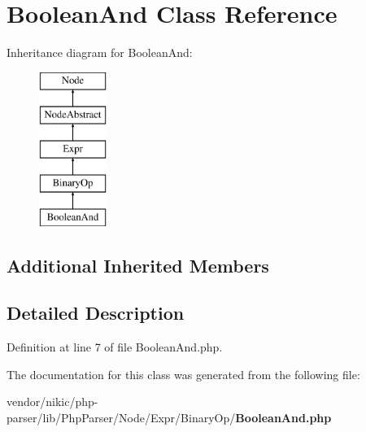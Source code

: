 \section{Boolean\+And Class Reference}
\label{class_php_parser_1_1_node_1_1_expr_1_1_binary_op_1_1_boolean_and}
Inheritance diagram for Boolean\+And\+:\begin{figure}[H]
\begin{center}
\leavevmode
\includegraphics[height=5.000000cm]{class_php_parser_1_1_node_1_1_expr_1_1_binary_op_1_1_boolean_and}
\end{center}
\end{figure}
\subsection*{Additional Inherited Members}


\subsection{Detailed Description}


Definition at line 7 of file Boolean\+And.\+php.



The documentation for this class was generated from the following file\+:\begin{DoxyCompactItemize}
\item 
vendor/nikic/php-\/parser/lib/\+Php\+Parser/\+Node/\+Expr/\+Binary\+Op/{\bf Boolean\+And.\+php}\end{DoxyCompactItemize}
